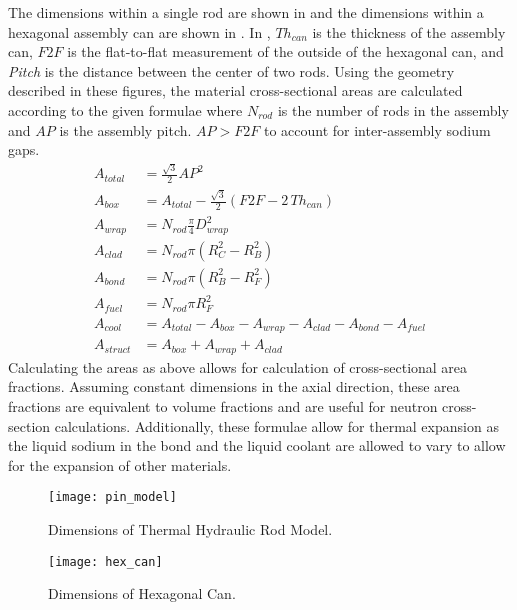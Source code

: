   The dimensions within a single rod are shown in  and the
  dimensions within a hexagonal assembly can are shown in . In
  , $T\!h_{can}$ is the thickness of the assembly can,
  $F\!2\!F$ is the flat-to-flat measurement of the outside of the hexagonal can,
  and \textit{Pitch} is the distance between the center of two rods.
  Using the geometry described in 
  these figures, the material cross-sectional areas are calculated according to 
  the given formulae where $N_{rod}$ is the number of rods in the assembly and
  $A\!P$ is the assembly pitch. $A\!P > F\!2\!F$ to account for inter-assembly
  sodium gaps.
  \begin{align}
    \label{eq:afrac_first}
    A_{total} &= \frac{\sqrt{3}}{2} A\!P^2 \\
    A_{box} &= A_{total} - 
      \frac{\sqrt{3}}{2} \left(  F\!2\!F - 2 \, T\!h_{can} \right) \\
    A_{wrap} &= N_{rod} \frac{\pi}{4} D_{wrap}^2 \\
    A_{clad} &= N_{rod} \pi (R_C^2 - R_B^2) \\
    A_{bond} &= N_{rod} \pi (R_B^2 - R_F^2) \\
    A_{fuel} &= N_{rod} \pi R_F^2 \\
    A_{cool} &= A_{total} - A_{box} - A_{wrap} - A_{clad} - A_{bond} -
      A_{fuel}\\
    \label{eq:afrac_last}
    A_{struct} &= A_{box} + A_{wrap} + A_{clad}
  \end{align}
  Calculating the areas as above allows for calculation of cross-sectional area
  fractions. Assuming constant dimensions in the axial
  direction, these area fractions are equivalent to volume fractions and are
  useful for neutron cross-section calculations. Additionally, these formulae
  allow for thermal expansion as the liquid sodium in the bond and
  the liquid coolant are allowed to vary to allow for the expansion of other 
  materials.

  \begin{figure}
    \centering
    \texttt{[image: pin\_model]}
    \caption{Dimensions of Thermal Hydraulic Rod Model.}
    \label{fig:pin_model}
  \end{figure}

  \begin{figure}
    \centering
    \texttt{[image: hex\_can]}
    \caption{Dimensions of Hexagonal Can.}
    \label{fig:hex_can}
  \end{figure}

